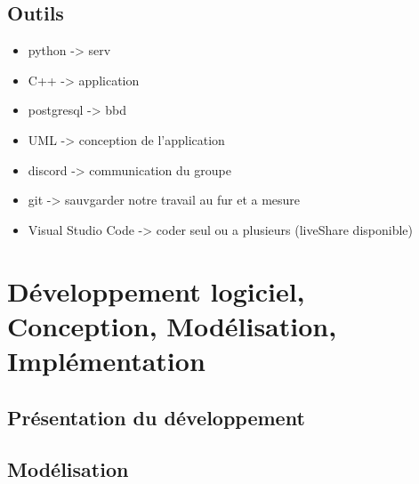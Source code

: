 \documentclass{report}
\begin{document}
\section{Outils} %
\begin{itemize}
    \item python -> serv
    \item C++ -> application
    \item postgresql -> bbd
    \item UML -> conception de l'application
    \item discord -> communication du groupe
    \item git -> sauvgarder notre travail au fur et a mesure
    \item Visual Studio Code -> coder seul ou a plusieurs (liveShare disponible)
\end{itemize}

\chapter{Développement logiciel, Conception, Modélisation, Implémentation}
\section{Présentation du développement}
\section{Modélisation} %
\end{document}
